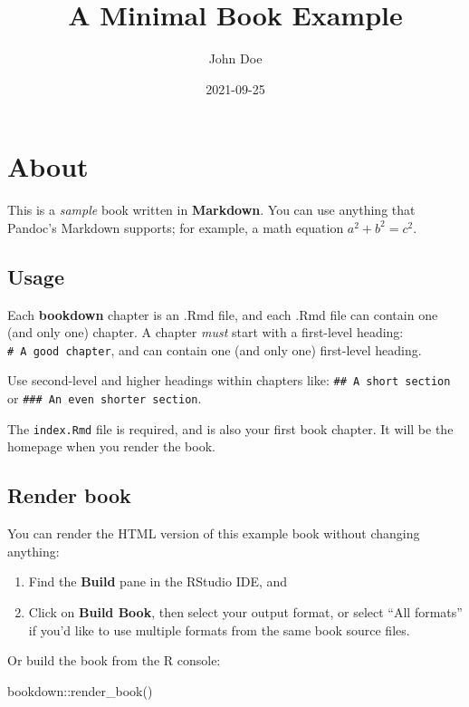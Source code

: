 \documentclass[
]{book}
\title{A Minimal Book Example}
\author{John Doe}
\date{2021-09-25}
\newenvironment{Shaded}{\begin{snugshade}}{\end{snugshade}}
\newcommand{\FunctionTok}[1]{\textcolor[rgb]{0.00,0.00,0.00}{#1}}
\newcommand{\NormalTok}[1]{#1}
\newcommand{\SpecialCharTok}[1]{\textcolor[rgb]{0.00,0.00,0.00}{#1}}
\theoremstyle{definition}
\theoremstyle{definition}
\theoremstyle{definition}
\theoremstyle{definition}
\theoremstyle{remark}
\begin{document}
\maketitle

{
\setcounter{tocdepth}{1}
\tableofcontents
}
\hypertarget{about}{%
\chapter{About}\label{about}}

This is a \emph{sample} book written in \textbf{Markdown}. You can use anything that Pandoc's Markdown supports; for example, a math equation \(a^2 + b^2 = c^2\).

\hypertarget{usage}{%
\section{Usage}\label{usage}}

Each \textbf{bookdown} chapter is an .Rmd file, and each .Rmd file can contain one (and only one) chapter. A chapter \emph{must} start with a first-level heading: \texttt{\#\ A\ good\ chapter}, and can contain one (and only one) first-level heading.

Use second-level and higher headings within chapters like: \texttt{\#\#\ A\ short\ section} or \texttt{\#\#\#\ An\ even\ shorter\ section}.

The \texttt{index.Rmd} file is required, and is also your first book chapter. It will be the homepage when you render the book.

\hypertarget{render-book}{%
\section{Render book}\label{render-book}}

You can render the HTML version of this example book without changing anything:

\begin{enumerate}
\def\labelenumi{\arabic{enumi}.}
\item
  Find the \textbf{Build} pane in the RStudio IDE, and
\item
  Click on \textbf{Build Book}, then select your output format, or select ``All formats'' if you'd like to use multiple formats from the same book source files.
\end{enumerate}

Or build the book from the R console:

\begin{Shaded}
\begin{Highlighting}[]
\NormalTok{bookdown}\SpecialCharTok{::}\FunctionTok{render\_book}\NormalTok{()}
\end{Highlighting}
\end{Shaded}
\end{document}
